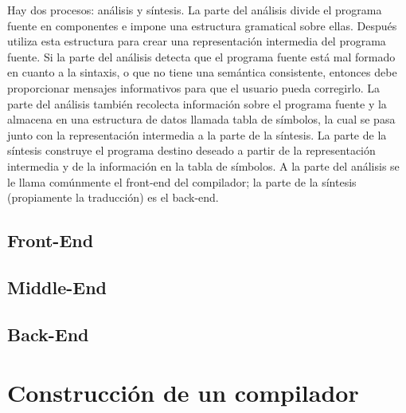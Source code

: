 Hay dos procesos: análisis y síntesis. La parte del análisis divide el programa fuente en componentes e impone una estructura gramatical sobre ellas. Después utiliza esta estructura para crear una representación intermedia del programa fuente. Si la parte del análisis detecta que el programa fuente está mal formado en cuanto a la sintaxis, o que no tiene una semántica consistente, entonces debe proporcionar mensajes informativos para que el usuario pueda corregirlo. La parte del análisis también recolecta información sobre el programa fuente y la almacena en una estructura de datos llamada tabla de símbolos, la cual se pasa junto con la representación intermedia a la parte de la síntesis. La parte de la síntesis construye el programa destino deseado a partir de la representación intermedia y de la información en la tabla de símbolos. A la parte del análisis se le llama comúnmente el front-end del compilador; la parte de la síntesis (propiamente la traducción) es el back-end.

\subsection{Front-End}
\subsection{Middle-End}
\subsection{Back-End}

\section{Construcción de un compilador}



